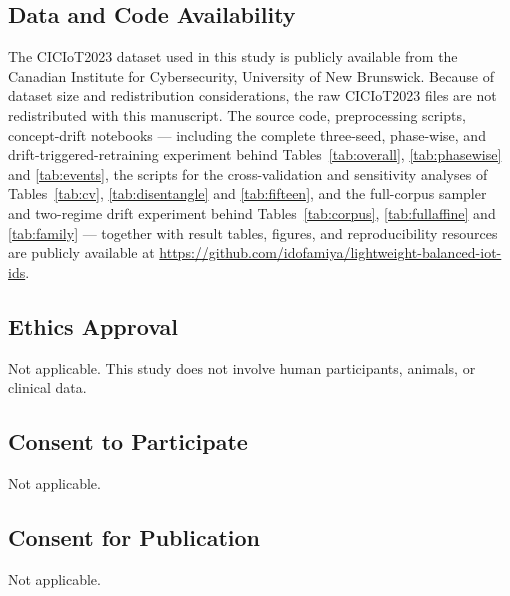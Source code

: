 \documentclass[11pt,a4paper]{article}
\begin{document}
\subsection*{Data and Code Availability}
The CICIoT2023 dataset used in this study is publicly available from the
Canadian Institute for Cybersecurity, University of New Brunswick.
Because of dataset size and redistribution considerations, the raw
CICIoT2023 files are not redistributed with this manuscript. The source
code, preprocessing scripts, concept-drift notebooks --- including the
complete three-seed, phase-wise, and drift-triggered-retraining
experiment behind Tables~\ref{tab:overall}, \ref{tab:phasewise} and
\ref{tab:events}, the scripts for the cross-validation and
sensitivity analyses of Tables~\ref{tab:cv}, \ref{tab:disentangle} and
\ref{tab:fifteen}, and the full-corpus sampler and two-regime drift experiment
behind Tables~\ref{tab:corpus}, \ref{tab:fullaffine} and \ref{tab:family} --- together with result tables, figures, and
reproducibility resources are publicly available at
\url{https://github.com/idofamiya/lightweight-balanced-iot-ids}.

\subsection*{Ethics Approval}
Not applicable. This study does not involve human participants, animals,
or clinical data.

\subsection*{Consent to Participate}
Not applicable.

\subsection*{Consent for Publication}
Not applicable.

\clearpage


\end{document}
